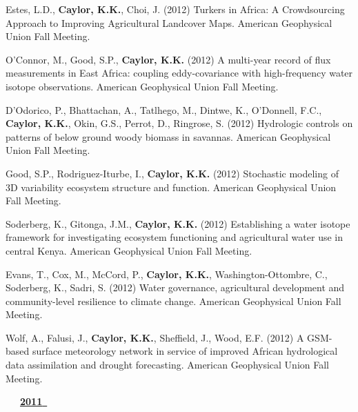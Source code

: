 \begin{etaremune}
\item Estes, L.D., \textbf{ Caylor, K.K.}, Choi, J. (2012) Turkers in Africa: A Crowdsourcing Approach to Improving Agricultural Landcover Maps. American Geophysical Union Fall Meeting.
\item O'Connor, M., Good, S.P., \textbf{ Caylor, K.K.} (2012) A multi-year record of flux measurements in East Africa: coupling eddy-covariance with high-frequency water isotope observations. American Geophysical Union Fall Meeting.
\item D'Odorico, P., Bhattachan, A., Tatlhego, M., Dintwe, K., O'Donnell, F.C., \textbf{ Caylor, K.K.}, Okin, G.S., Perrot, D., Ringrose, S. (2012) Hydrologic controls on patterns of below ground woody biomass in savannas. American Geophysical Union Fall Meeting.
\item Good, S.P., Rodriguez-Iturbe, I., \textbf{ Caylor, K.K.} (2012) Stochastic modeling of 3D variability ecosystem structure and function. American Geophysical Union Fall Meeting.
\item Soderberg, K., Gitonga, J.M., \textbf{ Caylor, K.K.} (2012) Establishing a water isotope framework for investigating ecosystem functioning and agricultural water use in central Kenya. American Geophysical Union Fall Meeting.
\item Evans, T., Cox, M., McCord, P., \textbf{ Caylor, K.K.}, Washington-Ottombre, C., Soderberg, K., Sadri, S. (2012) Water governance, agricultural development and community-level resilience to climate change. American Geophysical Union Fall Meeting.
\item Wolf, A., Falusi, J., \textbf{ Caylor, K.K.}, Sheffield, J., Wood, E.F. (2012) A GSM-based surface meteorology network in service of improved African hydrological data assimilation and drought forecasting. American Geophysical Union Fall Meeting.

\vspace{0.1in}
\mbox{\ \ \ \underline{\textbf{2011 }}}
\vspace{0.1in}


\end{etaremune}
